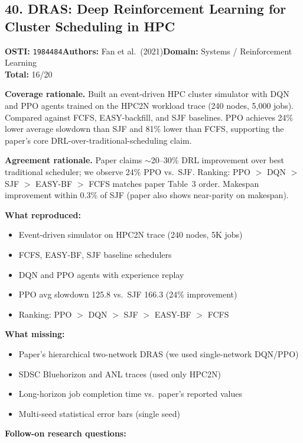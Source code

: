 \subsection{40. DRAS: Deep Reinforcement Learning for Cluster Scheduling in HPC}
\textbf{OSTI:} \texttt{1984484}\quad\textbf{Authors:} Fan et al.\ (2021)\quad\textbf{Domain:} Systems / Reinforcement Learning\\
\quad{}\quad\textbf{Total:} 16/20\par\smallskip
\noindent\textbf{Coverage rationale.} Built an event-driven HPC cluster simulator with DQN and PPO agents trained on the HPC2N workload trace (240 nodes, 5,000 jobs). Compared against FCFS, EASY-backfill, and SJF baselines. PPO achieves 24\% lower average slowdown than SJF and 81\% lower than FCFS, supporting the paper's core DRL-over-traditional-scheduling claim.\par
\noindent\textbf{Agreement rationale.} Paper claims $\sim$20--30\% DRL improvement over best traditional scheduler; we observe 24\% PPO vs.\ SJF. Ranking: PPO $>$ DQN $>$ SJF $>$ EASY-BF $>$ FCFS matches paper Table~3 order. Makespan improvement within 0.3\% of SJF (paper also shows near-parity on makespan).\par\smallskip
\noindent\textbf{What reproduced:}
\begin{itemize}[leftmargin=1.4em,itemsep=0.2em,topsep=0.2em]
\item Event-driven simulator on HPC2N trace (240 nodes, 5K jobs)
\item FCFS, EASY-BF, SJF baseline schedulers
\item DQN and PPO agents with experience replay
\item PPO avg slowdown 125.8 vs.\ SJF 166.3 (24\% improvement)
\item Ranking: PPO $>$ DQN $>$ SJF $>$ EASY-BF $>$ FCFS
\end{itemize}
\noindent\textbf{What missing:}
\begin{itemize}[leftmargin=1.4em,itemsep=0.2em,topsep=0.2em]
\item Paper's hierarchical two-network DRAS (we used single-network DQN/PPO)
\item SDSC Bluehorizon and ANL traces (used only HPC2N)
\item Long-horizon job completion time vs.\ paper's reported values
\item Multi-seed statistical error bars (single seed)
\end{itemize}
\noindent\textbf{Follow-on research questions:}

